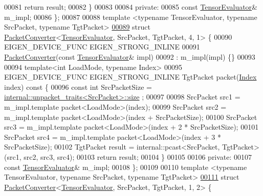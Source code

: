 \begin{DoxyCode}
00081     \textcolor{keywordflow}{return} result;
00082   \}
00083 
00084  \textcolor{keyword}{private}:
00085   \textcolor{keyword}{const} \hyperlink{struct_eigen_1_1_tensor_evaluator}{TensorEvaluator}& m\_impl;
00086 \};
00087 
00088 \textcolor{keyword}{template} <\textcolor{keyword}{typename} TensorEvaluator, \textcolor{keyword}{typename} SrcPacket, \textcolor{keyword}{typename} TgtPacket>
\hyperlink{struct_eigen_1_1_packet_converter_3_01_tensor_evaluator_00_01_src_packet_00_01_tgt_packet_00_014_00_011_01_4}{00089} \textcolor{keyword}{struct }\hyperlink{struct_eigen_1_1_packet_converter}{PacketConverter}<\hyperlink{struct_eigen_1_1_tensor_evaluator}{TensorEvaluator}, SrcPacket, TgtPacket, 4, 1> \{
00090   EIGEN\_DEVICE\_FUNC EIGEN\_STRONG\_INLINE
00091   \hyperlink{struct_eigen_1_1_packet_converter}{PacketConverter}(\textcolor{keyword}{const} \hyperlink{struct_eigen_1_1_tensor_evaluator}{TensorEvaluator}& impl)
00092       : m\_impl(impl) \{\}
00093 
00094   \textcolor{keyword}{template}<\textcolor{keywordtype}{int} LoadMode, \textcolor{keyword}{typename} Index>
00095   EIGEN\_DEVICE\_FUNC EIGEN\_STRONG\_INLINE TgtPacket packet(\hyperlink{namespace_eigen_a62e77e0933482dafde8fe197d9a2cfde}{Index} index)\textcolor{keyword}{ const }\{
00096     \textcolor{keyword}{const} \textcolor{keywordtype}{int} SrcPacketSize = \hyperlink{struct_eigen_1_1internal_1_1unpacket__traits}{internal::unpacket\_traits<SrcPacket>::size}
      ;
00097 
00098     SrcPacket src1 = m\_impl.template packet<LoadMode>(index);
00099     SrcPacket src2 = m\_impl.template packet<LoadMode>(index + SrcPacketSize);
00100     SrcPacket src3 = m\_impl.template packet<LoadMode>(index + 2 * SrcPacketSize);
00101     SrcPacket src4 = m\_impl.template packet<LoadMode>(index + 3 * SrcPacketSize);
00102     TgtPacket result = internal::pcast<SrcPacket, TgtPacket>(src1, src2, src3, src4);
00103     \textcolor{keywordflow}{return} result;
00104   \}
00105 
00106  \textcolor{keyword}{private}:
00107   \textcolor{keyword}{const} \hyperlink{struct_eigen_1_1_tensor_evaluator}{TensorEvaluator}& m\_impl;
00108 \};
00109 
00110 \textcolor{keyword}{template} <\textcolor{keyword}{typename} TensorEvaluator, \textcolor{keyword}{typename} SrcPacket, \textcolor{keyword}{typename} TgtPacket>
\hyperlink{struct_eigen_1_1_packet_converter_3_01_tensor_evaluator_00_01_src_packet_00_01_tgt_packet_00_011_00_012_01_4}{00111} \textcolor{keyword}{struct }\hyperlink{struct_eigen_1_1_packet_converter}{PacketConverter}<\hyperlink{struct_eigen_1_1_tensor_evaluator}{TensorEvaluator}, SrcPacket, TgtPacket, 1, 2> \{

\end{DoxyCode}
